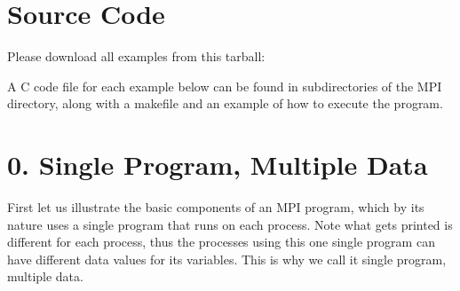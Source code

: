 \documentclass[letterpaper,10pt,openany,oneside]{sphinxmanual}
\begin{document}
\section{Source Code}
\label{MessagePassing/MPI_Patternlets:source-code}
Please download all examples from this tarball:

A C code file for each example below can be found in subdirectories of the MPI directory,
along with a makefile and an example of how to execute the program.


\section{0. Single Program, Multiple Data}
\label{MessagePassing/MPI_Patternlets:single-program-multiple-data}
First let us illustrate the basic components of an MPI program,
which by its nature uses a single program that runs on each process.
Note what gets printed is different for each process, thus the
processes using this one single program can have different data values
for its variables.  This is why we call it single program, multiple data.
\end{document}
